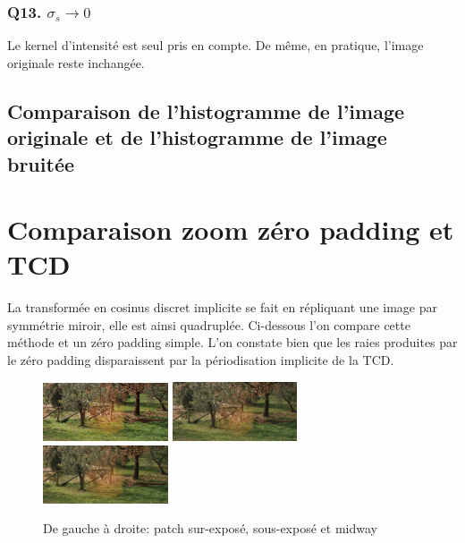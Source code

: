 \documentclass{article}
\begin{document}
\subsubsection*{Q13. $\sigma_s \rightarrow 0 $}
Le kernel d'intensité est seul pris en compte. De même, en pratique, l'image originale reste inchangée.

\subsection*{Comparaison de l'histogramme de l'image originale et de l'histogramme de l'image bruitée}

\section{Comparaison zoom zéro padding et TCD}
La transformée en cosinus discret implicite se fait en répliquant une image par symmétrie miroir, elle est ainsi quadruplée. Ci-dessous l'on compare cette méthode et un zéro padding simple. L'on constate bien que les raies produites par le zéro padding disparaissent par la périodisation implicite de la TCD.

\begin{figure}[h]
	\includegraphics[width=0.33\textwidth]{P1c.jpg}
	\includegraphics[width=0.33\textwidth]{P2c.jpg}
	\includegraphics[width=0.33\textwidth]{P1Mc.png}
  \caption{De gauche à droite: patch sur-exposé, sous-exposé et midway}
\end{figure}
\end{document}
